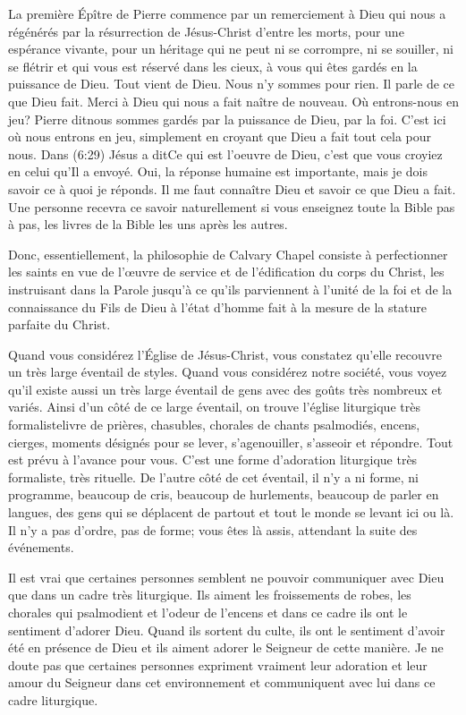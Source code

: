 La première Épître de Pierre commence par un remerciement à Dieu \og qui nous a régénérés par la résurrection de
Jésus-Christ d’entre les morts, pour une espérance vivante, pour un héritage qui ne peut ni se corrompre, ni se
souiller, ni se flétrir et qui vous est réservé dans les cieux, à vous qui êtes gardés en la puissance de Dieu.\fg{} Tout vient
de Dieu. Nous n’y sommes pour rien. Il parle de ce que Dieu fait. Merci à Dieu qui nous a fait naître de nouveau. Où
entrons-nous en jeu? Pierre dit\frcolon\og nous sommes gardés par la puissance de Dieu, par la foi.\fg{} C’est ici où nous entrons
en jeu, simplement en croyant que Dieu a fait tout cela pour nous. Dans (6:29) Jésus a dit\frcolon\og Ce qui est l’oeuvre
de Dieu, c’est que vous croyiez en celui qu’Il a envoyé.\fg{} Oui, la réponse humaine est importante, mais je dois savoir
ce à quoi je réponds. Il me faut connaître Dieu et savoir ce que Dieu a fait. Une personne recevra ce savoir
naturellement si vous enseignez toute la Bible pas à pas, les livres de la Bible les uns après les autres.

Donc, essentiellement, la philosophie de Calvary Chapel consiste à perfectionner les saints en vue de l’œuvre de
service et de l’édification du corps du Christ, les instruisant dans la Parole jusqu’à ce qu’ils parviennent à l’unité de la
foi et de la connaissance du Fils de Dieu à l’état d’homme fait à la mesure de la stature parfaite du Christ.

Quand vous considérez l’Église de Jésus-Christ, vous constatez qu’elle recouvre un très large éventail de styles. Quand
vous considérez notre société, vous voyez qu’il existe aussi un très large éventail de gens avec des goûts très
nombreux et variés. Ainsi d’un côté de ce large éventail, on trouve l’église liturgique très formaliste\frcolon livre de prières,
chasubles, chorales de chants psalmodiés, encens, cierges, moments désignés pour se lever, s’agenouiller, s’asseoir et
répondre. Tout est prévu à l’avance pour vous. C’est une forme d’adoration liturgique très formaliste, très rituelle. De
l’autre côté de cet éventail, il n’y a ni forme, ni programme, beaucoup de cris, beaucoup de hurlements, beaucoup de
parler en langues, des gens qui se déplacent de partout et tout le monde se levant ici ou là. Il n’y a pas d’ordre, pas
de forme; vous êtes là assis, attendant la suite des événements.

Il est vrai que certaines personnes semblent ne pouvoir communiquer avec Dieu que dans un cadre très liturgique. Ils
aiment les froissements de robes, les chorales qui psalmodient et l’odeur de l’encens et dans ce cadre ils ont le
sentiment d’adorer Dieu. Quand ils sortent du culte, ils ont le sentiment d’avoir été en présence de Dieu et ils aiment
adorer le Seigneur de cette manière. Je ne doute pas que certaines personnes expriment vraiment leur adoration et
leur amour du Seigneur dans cet environnement et communiquent avec lui dans ce cadre liturgique.

